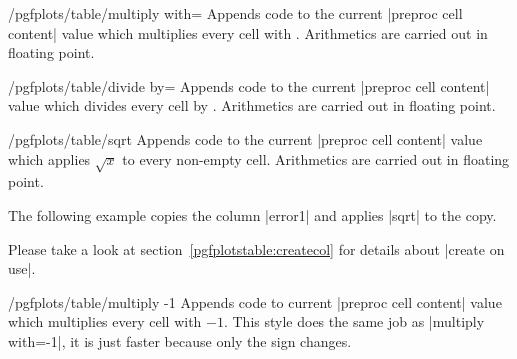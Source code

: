 \begin{stylekey}{/pgfplots/table/multiply with=}
	Appends code to the current |preproc cell content| value which multiplies every cell with . Arithmetics are carried out in floating point.	
\end{stylekey}

\begin{stylekey}{/pgfplots/table/divide by=}
	Appends code to the current |preproc cell content| value which divides every cell by . Arithmetics are carried out in floating point.	
\end{stylekey}

\begin{stylekey}{/pgfplots/table/sqrt}
	Appends code to the current |preproc cell content| value which applies $\sqrt{x}$ to every non-empty cell. Arithmetics are carried out in floating point.	

	The following example copies the column |error1| and applies |sqrt| to the copy.
\begin{codeexample}[]
\end{codeexample}
	Please take a look at section~\ref{pgfplotstable:createcol} for details about |create on use|.
\end{stylekey}

\begin{stylekey}{/pgfplots/table/multiply -1}
	Appends code to current |preproc cell content| value which multiplies every cell with $-1$. This style does the same job as |multiply with=-1|, it is just faster because only the sign changes.
\begin{codeexample}[]


\end{codeexample}
\end{stylekey}

